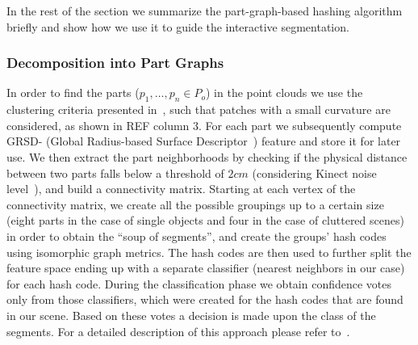 In the rest of the section we summarize the part-graph-based 
hashing algorithm briefly and show how we use it to guide
the interactive segmentation.

\subsubsection{Decomposition into Part Graphs}
\label{sec:part-graphs}
In order to find the parts ($p_{1}, \dots, p_{n} \in P_{o}$) 
in the point clouds we use the clustering criteria presented in~\cite{mozos11furniture},
such that patches with a small curvature are considered, as shown in
REF
column 3.  For each part we subsequently compute GRSD- (Global Radius-based 
Surface Descriptor~\cite{irosws11vosch}) feature and store it for later use. We then 
extract the part neighborhoods by checking if the physical distance between two 
parts falls below a threshold of $2cm$ (considering Kinect noise level~\cite{kinect_accuracy}), and build a connectivity matrix. 
Starting at each vertex of the connectivity matrix, we create all the possible groupings up to a certain size 
(eight parts in the case of single objects and four in the case of cluttered scenes) 
in order to obtain the ``soup of segments'', and create the groups' hash codes
using isomorphic graph metrics. The hash codes are then used to further split the feature 
space ending up with a separate classifier (nearest neighbors in our case) for each hash code. 
During the classification phase we obtain confidence votes only from those classifiers,
which were created for the hash codes that are found in our scene. Based on these votes
a decision is made upon the class of the segments. For a detailed description of this approach 
please refer to~\cite{marton12SC}.



